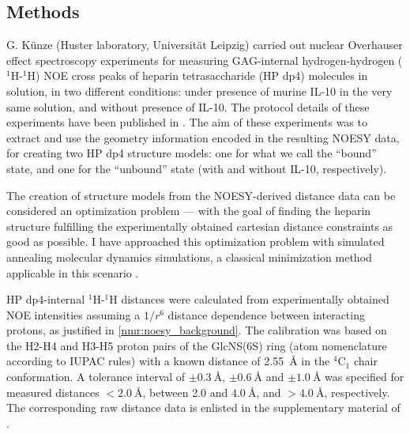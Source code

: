 \subsection{Methods} \label{nmr:methdos} G. Künze (Huster laboratory,
Universität Leipzig) carried out nuclear Overhauser effect spectroscopy
experiments for measuring GAG-internal hydrogen-hydrogen (${}^1$H-${}^1$H) NOE
cross peaks of heparin tetrasaccharide (HP dp4) molecules in solution, in two
different conditions: under presence of murine IL-10 in the very same solution,
and without presence of IL-10. The protocol details of these experiments have
been published in \cite{kuenze_gehrcke_2014}. The aim of these experiments was
to extract and use the geometry information encoded in the resulting NOESY data,
for creating two HP dp4 structure models: one for what we call the
\enquote{bound} state, and one for the \enquote{unbound} state (with and without
IL-10, respectively).

The creation of structure models from the NOESY-derived distance data can be
considered an optimization problem --- with the goal of finding the heparin
structure fulfilling the experimentally obtained cartesian distance constraints
as good as possible. I have approached this optimization problem with simulated
annealing molecular dynamics simulations, a classical minimization method
applicable in this scenario \cite{nilges_sim_annealing_noe_1988}.

HP dp4-internal ${}^1$H-${}^1$H distances were calculated from experimentally
obtained NOE intensities assuming a $1/r^6$ distance dependence between
interacting protons, as justified in \cref{nmr:noesy_background}. The
calibration was based on the H2-H4 and H3-H5 proton pairs of the GlcNS(6S) ring
(atom nomenclature according to IUPAC rules) with a known distance of
\SI{2.55}{\angstrom} in the ${}^4$C${}_1$ chair conformation. A tolerance
interval of $\pm \SI{0.3}{\angstrom}$, $\pm \SI{0.6}{\angstrom}$ and $\pm
\SI{1.0}{\angstrom}$ was specified for measured distances $<
\SI{2.0}{\angstrom}$, between \num{2.0} and $\SI{4.0}{\angstrom}$, and $>
\SI{4.0}{\angstrom}$, respectively. The corresponding raw distance data is
enlisted in the supplementary material of \cite{kuenze_gehrcke_2014}.

